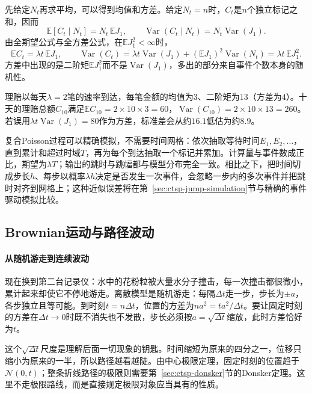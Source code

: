 先给定$N_t$再求平均，可以得到均值和方差。给定$N_t=n$时，$C_t$是$n$个独立标记之和，因而
\[
  \mathbb E[C_t\mid N_t]=N_t\,\mathbb EJ_1,\qquad
  \operatorname{Var}(C_t\mid N_t)=N_t\operatorname{Var}(J_1).
\]
由全期望公式与全方差公式，在$\mathbb EJ_1^2<\infty$时，
\begin{equation}
  \mathbb EC_t=\lambda t\,\mathbb EJ_1,\qquad
  \operatorname{Var}(C_t)=\lambda t\operatorname{Var}(J_1)+(\mathbb EJ_1)^2\operatorname{Var}(N_t)=\lambda t\,\mathbb EJ_1^2 .
  \label{eq:ctsp-compound-moments}
\end{equation}
方差中出现的是二阶矩$\mathbb EJ_1^2$而不是$\operatorname{Var}(J_1)$，多出的部分来自事件个数本身的随机性。

\begin{example}[十天的理赔总额]
  \label{ex:ctsp-claims}
  理赔以每天$\lambda=2$笔的速率到达，每笔金额的均值为$3$、二阶矩为$13$（方差为$4$）。十天的理赔总额$C_{10}$满足$\mathbb EC_{10}=2\times10\times3=60$，$\operatorname{Var}(C_{10})=2\times10\times13=260$。若误用$\lambda t\operatorname{Var}(J_1)=80$作为方差，标准差会从约$16.1$低估为约$8.9$。
\end{example}

复合Poisson过程可以精确模拟，不需要时间网格：依次抽取等待时间$E_1,E_2,\ldots$，直到累计和超过时域$T$，再为每个到达抽取一个标记并累加。计算量与事件数成正比，期望为$\lambda T$；输出的跳时与跳幅都与模型分布完全一致。相比之下，把时间切成步长$h$、每步以概率$\lambda h$决定是否发生一次事件，会忽略一步内的多次事件并把跳时对齐到网格上；这种近似误差将在第~\ref{sec:ctsp-jump-simulation}节与精确的事件驱动模拟比较。

\subsection{Brownian运动与路径波动}
\label{sec:ctsp-brownian}

\paragraph{从随机游走到连续波动}
现在换到第二台记录仪：水中的花粉粒被大量水分子撞击，每一次撞击都很微小，累计起来却使它不停地游走。离散模型是随机游走：每隔$\Delta t$走一步，步长为$\pm a$，各步独立且等可能。到时刻$t=n\Delta t$，位置的方差为$na^2=ta^2/\Delta t$。要让固定时刻的方差在$\Delta t\to0$时既不消失也不发散，步长必须按$a=\sqrt{\Delta t}$缩放，此时方差恰好为$t$。

这个$\sqrt{\Delta t}$尺度是理解后面一切现象的钥匙。时间缩短为原来的四分之一，位移只缩小为原来的一半，所以路径越看越陡。由中心极限定理，固定时刻的位置趋于$\mathcal N(0,t)$；整条折线路径的极限则需要第~\ref{sec:ctsp-donsker}节的Donsker定理。这里不走极限路线，而是直接规定极限对象应当具有的性质。

